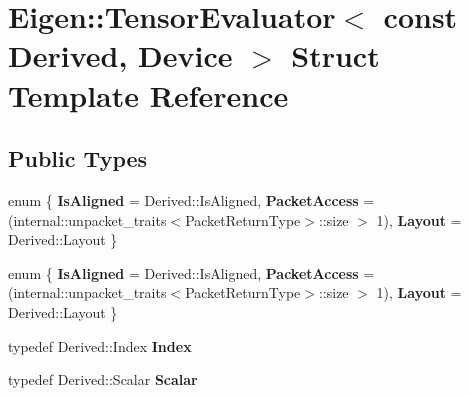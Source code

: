 \hypertarget{struct_eigen_1_1_tensor_evaluator_3_01const_01_derived_00_01_device_01_4}{}\section{Eigen\+:\+:Tensor\+Evaluator$<$ const Derived, Device $>$ Struct Template Reference}
\label{struct_eigen_1_1_tensor_evaluator_3_01const_01_derived_00_01_device_01_4}
\subsection*{Public Types}
\begin{DoxyCompactItemize}
\item 
\mbox{\label{struct_eigen_1_1_tensor_evaluator_3_01const_01_derived_00_01_device_01_4_ab2a7ab78ef817d3c865e3d577ab59a70}} 
enum \{ {\bfseries Is\+Aligned} = Derived\+:\+:Is\+Aligned, 
{\bfseries Packet\+Access} = (internal\+:\+:unpacket\+\_\+traits$<$Packet\+Return\+Type$>$\+:\+:size $>$ 1), 
{\bfseries Layout} = Derived\+:\+:Layout
 \}
\item 
\mbox{\label{struct_eigen_1_1_tensor_evaluator_3_01const_01_derived_00_01_device_01_4_aab6ef2eabdd45c5e68c1f31454bea53b}} 
enum \{ {\bfseries Is\+Aligned} = Derived\+:\+:Is\+Aligned, 
{\bfseries Packet\+Access} = (internal\+:\+:unpacket\+\_\+traits$<$Packet\+Return\+Type$>$\+:\+:size $>$ 1), 
{\bfseries Layout} = Derived\+:\+:Layout
 \}
\item 
\mbox{\label{struct_eigen_1_1_tensor_evaluator_3_01const_01_derived_00_01_device_01_4_a9ef465fa713bc2ca62aa3f8cf5628b4c}} 
typedef Derived\+::\+Index {\bfseries Index}
\item 
\mbox{\label{struct_eigen_1_1_tensor_evaluator_3_01const_01_derived_00_01_device_01_4_a6066c628b5390c555921e11c7054224a}} 
typedef Derived\+::\+Scalar {\bfseries Scalar}
\item 
\mbox{\label{struct_eigen_1_1_tensor_evaluator_3_01const_01_derived_00_01_device_01_4_ac770be11dea33164f023b4d93ad48f1b}} 

\end{DoxyCompactItemize}
